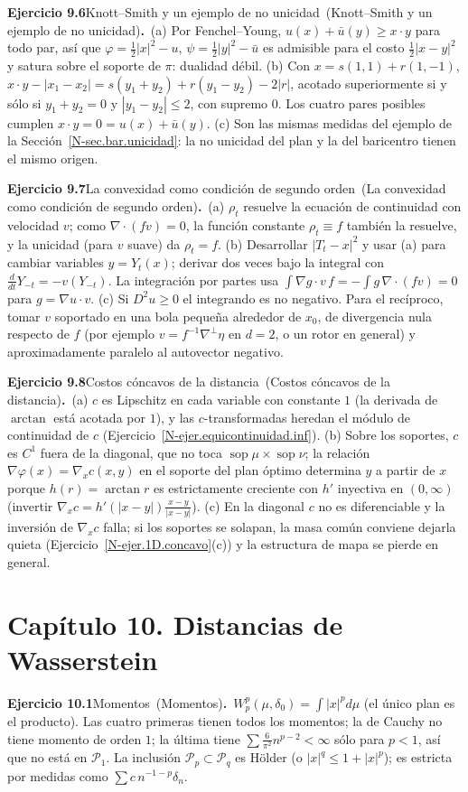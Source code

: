 \documentclass[11pt,a4paper]{amsart}
\def\sop{\operatorname {\mathrm{sop}}}
\theoremstyle{remark}
\theoremstyle{definition}
\numberwithin{subsection}{section}
\numberwithin{equation}{section}
\newcommand{\ejlabel}[2]{\par\medskip\noindent\textbf{Ejercicio #1}\ifx\relax#2\relax\else\ (#2)\fi\textbf{.}\ }
\begin{document}
\ejlabel{9.6}{Knott--Smith y un ejemplo de no unicidad}(a) Por Fenchel--Young, $u(x)+\bar u(y)\ge x\cdot y$ para todo par, así que $\varphi=\frac12|x|^2-u$, $\psi=\frac12|y|^2-\bar u$ es admisible para el costo $\frac12|x-y|^2$ y satura sobre el soporte de $\pi$: dualidad débil. (b) Con $x=s(1,1)+r(1,-1)$, $x\cdot y-|x_1-x_2|=s(y_1+y_2)+r(y_1-y_2)-2|r|$, acotado superiormente si y sólo si $y_1+y_2=0$ y $|y_1-y_2|\le2$, con supremo $0$. Los cuatro pares posibles cumplen $x\cdot y=0=u(x)+\bar u(y)$. (c) Son las mismas medidas del ejemplo de la Sección~\ref{N-sec.bar.unicidad}: la no unicidad del plan y la del baricentro tienen el mismo origen.

\ejlabel{9.7}{La convexidad como condición de segundo orden}(a) $\rho_t$ resuelve la ecuación de continuidad con velocidad $v$; como $\nabla\cdot(fv)=0$, la función constante $\rho_t\equiv f$ también la resuelve, y la unicidad (para $v$ suave) da $\rho_t=f$. (b) Desarrollar $|T_t-x|^2$ y usar (a) para cambiar variables $y=Y_t(x)$; derivar dos veces bajo la integral con $\frac{d}{dt}Y_{-t}=-v(Y_{-t})$. La integración por partes usa $\int\nabla g\cdot v\,f=-\int g\,\nabla\cdot(fv)=0$ para $g=\nabla u\cdot v$. (c) Si $D^2u\ge0$ el integrando es no negativo. Para el recíproco, tomar $v$ soportado en una bola pequeña alrededor de $x_0$, de divergencia nula respecto de $f$ (por ejemplo $v=f^{-1}\nabla^\perp\eta$ en $d=2$, o un rotor en general) y aproximadamente paralelo al autovector negativo.

\ejlabel{9.8}{Costos cóncavos de la distancia}(a) $c$ es Lipschitz en cada variable con constante $1$ (la derivada de $\arctan$ está acotada por $1$), y las $c$-transformadas heredan el módulo de continuidad de $c$ (Ejercicio~\ref{N-ejer.equicontinuidad.inf}). (b) Sobre los soportes, $c$ es $C^1$ fuera de la diagonal, que no toca $\sop\mu\times\sop\nu$; la relación $\nabla\varphi(x)=\nabla_xc(x,y)$ en el soporte del plan óptimo determina $y$ a partir de $x$ porque $h(r)=\arctan r$ es estrictamente creciente con $h'$ inyectiva en $(0,\infty)$ (invertir $\nabla_xc=h'(|x-y|)\frac{x-y}{|x-y|}$). (c) En la diagonal $c$ no es diferenciable y la inversión de $\nabla_xc$ falla; si los soportes se solapan, la masa común conviene dejarla quieta (Ejercicio~\ref{N-ejer.1D.concavo}(c)) y la estructura de mapa se pierde en general.

\section*{Capítulo 10. Distancias de Wasserstein}
\ejlabel{10.1}{Momentos}$W_p^p(\mu,\delta_0)=\int|x|^pd\mu$ (el único plan es el producto). Las cuatro primeras tienen todos los momentos; la de Cauchy no tiene momento de orden $1$; la última tiene $\sum\frac6{\pi^2}n^{p-2}<\infty$ sólo para $p<1$, así que no está en $\mathcal P_1$. La inclusión $\mathcal P_p\subset\mathcal P_q$ es Hölder (o $|x|^q\le1+|x|^p$); es estricta por medidas como $\sum c\,n^{-1-p}\delta_n$.
\end{document}
